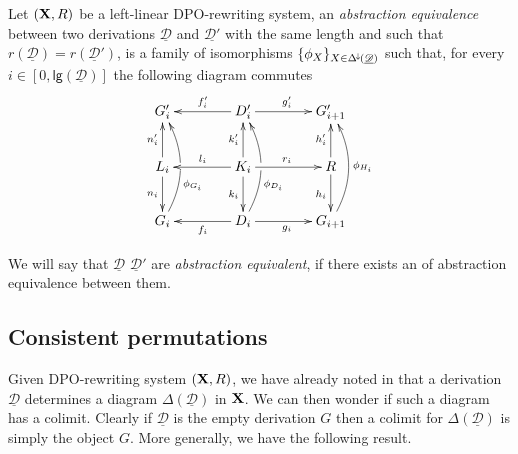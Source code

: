 \documentclass[a4paper,UKenglish,cleveref,pdftex, thm-restate,numberwithinsect]{lipics}
\newcommand{\Deltamin}{\Delta^{\hspace{-1pt}\downarrow\hspace{-1pt}}}
\def\R{\mathsf{R}}
\def\X{\textbf {\textup{X}}}
\newcommand{\dder}[1]{\mathscr{#1}}
\newcommand{\der}[1]{\underline{\dder{#1}}}
\newcommand{\lgh}[0]{\mathsf{lg}}
\begin{document}
\begin{definition}Let $(\X, \R)$ be a left-linear DPO-rewriting system,  an \emph{abstraction equivalence} between two derivations $\der{D}$ and $\der{D'}$ with the same length and such that $r(\der{D})=r(\der{D}')$, is a family of isomorphisms $\{\phi_X\}_{X\in \Deltamin(\der{D})}$ such that, for every $i\in [0, \lgh(\der{D})]$ the following diagram commutes
	\[\xymatrix@C=40pt{G'_i&D'_i \ar[r]^{g'_i} \ar[l]_{f'_i}&G'_{i+1}\\  L_i \ar[u]^{n'_i} \ar[d]_{n_i}& K_i \ar[u]^{k'_i} \ar[d]_{k_i} \ar[r]^{r_i} \ar[l]_{l_i} &R\ar[u]^{h'_i} \ar[d]_{h_i}\\G_i \ar@/_.45cm/[uu]_(.35){\phi_{G_i}}|\hole&D_i\ar[l]^{f_i}\ar@/_.45cm/[uu]_(.35){\phi_{D_i}}|\hole \ar[r]_{g_i}&G_{i+1}\ar@/_.45cm/[uu]_{\phi_{H_i}}}\]

We will say that  $\der{D}$ $\der{D}'$  are \emph{abstraction equivalent}, if there exists an of abstraction equivalence between them.
\end{definition}

\iffalse 

\subsection{Consistent permutations}

Given DPO-rewriting system $(\X, \R)$,  we have already noted in  that a derivation $\der{D}$  determines a diagram $\Delta(\der{D})$ in $\X$. We can then wonder if such a diagram has a colimit. Clearly if $\der{D}$ is the empty derivation $G$ then a colimit for $\Delta(\der{D})$ is simply the object $G$. More generally, we have the following result.
\end{document}
